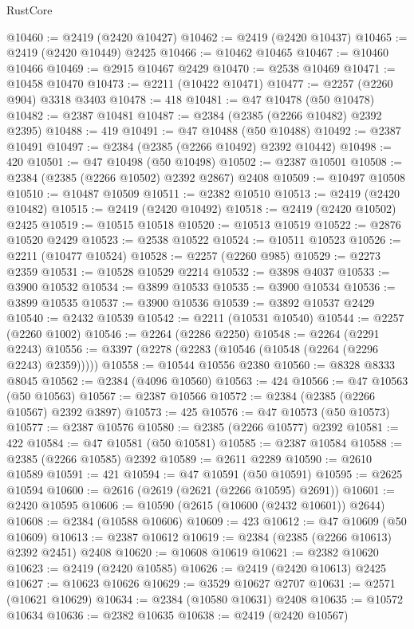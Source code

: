 \begin{lexlean}{RustCore}
\begin{coremodule}
@10460 := @2419 (@2420 @10427)
@10462 := @2419 (@2420 @10437)
@10465 := @2419 (@2420 @10449) @2425
@10466 := @10462 @10465
@10467 := @10460 @10466
@10469 := @2915 @10467 @2429
@10470 := @2538 @10469
@10471 := @10458 @10470
@10473 := @2211 (@10422 @10471)
@10477 := @2257 (@2260 @904) @3318 @3403
@10478 := 418
@10481 := @47 @10478 (@50 @10478)
@10482 := @2387 @10481
@10487 := @2384 (@2385 (@2266 @10482) @2392 @2395)
@10488 := 419
@10491 := @47 @10488 (@50 @10488)
@10492 := @2387 @10491
@10497 := @2384 (@2385 (@2266 @10492) @2392 @10442)
@10498 := 420
@10501 := @47 @10498 (@50 @10498)
@10502 := @2387 @10501
@10508 := @2384 (@2385 (@2266 @10502) @2392 @2867) @2408
@10509 := @10497 @10508
@10510 := @10487 @10509
@10511 := @2382 @10510
@10513 := @2419 (@2420 @10482)
@10515 := @2419 (@2420 @10492)
@10518 := @2419 (@2420 @10502) @2425
@10519 := @10515 @10518
@10520 := @10513 @10519
@10522 := @2876 @10520 @2429
@10523 := @2538 @10522
@10524 := @10511 @10523
@10526 := @2211 (@10477 @10524)
@10528 := @2257 (@2260 @985)
@10529 := @2273 @2359
@10531 := @10528 @10529 @2214
@10532 := @3898 @4037
@10533 := @3900 @10532
@10534 := @3899 @10533
@10535 := @3900 @10534
@10536 := @3899 @10535
@10537 := @3900 @10536
@10539 := @3892 @10537 @2429
@10540 := @2432 @10539
@10542 := @2211 (@10531 @10540)
@10544 := @2257 (@2260 @1002)
@10546 := @2264 (@2286 @2250)
@10548 := @2264 (@2291 @2243)
@10556 := @3397 (@2278 (@2283 (@10546 (@10548 (@2264 (@2296 @2243) @2359)))))
@10558 := @10544 @10556 @2380
@10560 := @8328 @8333 @8045
@10562 := @2384 (@4096 @10560)
@10563 := 424
@10566 := @47 @10563 (@50 @10563)
@10567 := @2387 @10566
@10572 := @2384 (@2385 (@2266 @10567) @2392 @3897)
@10573 := 425
@10576 := @47 @10573 (@50 @10573)
@10577 := @2387 @10576
@10580 := @2385 (@2266 @10577) @2392
@10581 := 422
@10584 := @47 @10581 (@50 @10581)
@10585 := @2387 @10584
@10588 := @2385 (@2266 @10585) @2392
@10589 := @2611 @2289
@10590 := @2610 @10589
@10591 := 421
@10594 := @47 @10591 (@50 @10591)
@10595 := @2625 @10594
@10600 := @2616 (@2619 (@2621 (@2266 @10595) @2691))
@10601 := @2420 @10595
@10606 := @10590 (@2615 (@10600 (@2432 @10601)) @2644)
@10608 := @2384 (@10588 @10606)
@10609 := 423
@10612 := @47 @10609 (@50 @10609)
@10613 := @2387 @10612
@10619 := @2384 (@2385 (@2266 @10613) @2392 @2451) @2408
@10620 := @10608 @10619
@10621 := @2382 @10620
@10623 := @2419 (@2420 @10585)
@10626 := @2419 (@2420 @10613) @2425
@10627 := @10623 @10626
@10629 := @3529 @10627 @2707
@10631 := @2571 (@10621 @10629)
@10634 := @2384 (@10580 @10631) @2408
@10635 := @10572 @10634
@10636 := @2382 @10635
@10638 := @2419 (@2420 @10567)

\end{coremodule}
\end{lexlean}
